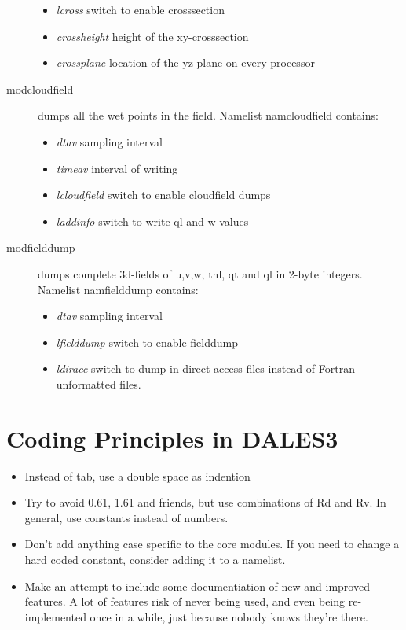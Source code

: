 \documentclass[a4paper,10pt]{article}
\begin{document}
\begin{description}
\begin{itemize}
\item \textit{lcross}      switch to enable crosssection
\item \textit{crossheight} height of the xy-crosssection
\item \textit{crossplane}  location of the yz-plane on every processor
\end{itemize}
\item [modcloudfield] dumps all the wet points in the field. Namelist namcloudfield contains:
\begin{itemize}
 \item \textit{dtav}           sampling interval
\item \textit{timeav}  interval of writing
\item \textit{lcloudfield}    switch to enable cloudfield dumps
\item\textit{laddinfo}       switch to write ql and w values
\end{itemize}

\item [modfielddump] dumps complete 3d-fields of u,v,w, thl, qt and ql in 2-byte integers. Namelist namfielddump contains:
\begin{itemize}
 \item \textit{dtav} sampling interval
\item \textit{lfielddump} switch to enable fielddump
\item \textit{ldiracc} switch to dump in direct access files instead of Fortran unformatted files.
\end{itemize}

\end{description}

\section{Coding Principles in DALES3}
\begin{itemize}
 \item Instead of tab, use a double space as indention
\item Try to avoid 0.61, 1.61 and friends, but use combinations of Rd and Rv. In general, use constants instead of numbers.
\item Don't add anything case specific to the core modules. If you need to change a hard coded constant, consider adding it to a namelist.
\item Make an attempt to include some documentiation of new and improved features. A lot of features risk of never being used, and even being re-implemented once in a while, just because nobody knows they're there.
\end{itemize}
\end{document}
